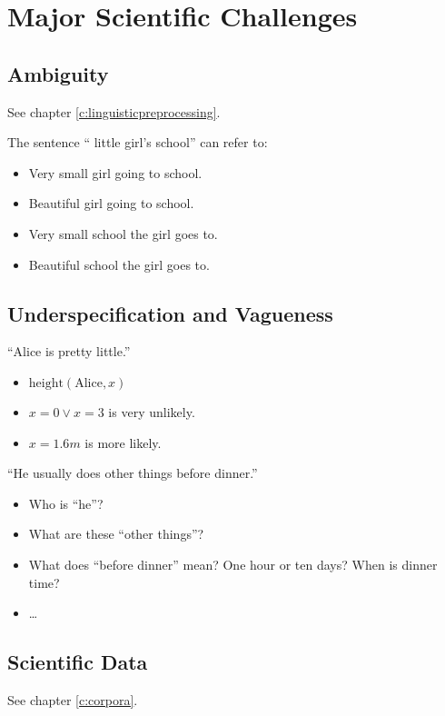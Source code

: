     \section{Major Scientific Challenges} %
        \subsection{Ambiguity} %
        	See chapter \ref{c:linguisticpreprocessing}.
        	
        	The sentence \enquote{ little girl's school} can refer to:
        	\begin{itemize}
        		\item Very small girl going to school.
        		\item Beautiful girl going to school.
        		\item Very small school the girl goes to.
        		\item Beautiful school the girl goes to.
        	\end{itemize}

        \subsection{Underspecification and Vagueness} %
            \enquote{Alice is pretty little.}
            \begin{itemize}
            	\item \( \text{height}(\text{Alice}, x) \)
            	\item \( x = 0 \lor x = 3 \) is very unlikely.
            	\item \( x = 1.6m \) is more likely.
            \end{itemize}
        
        	\enquote{He usually does other things before dinner.}
        	\begin{itemize}
        		\item Who is \enquote{he}?
        		\item What are these \enquote{other things}?
        		\item What does \enquote{before dinner} mean? One hour or ten days? When is dinner time?
        		\item \dots
        	\end{itemize}

        \subsection{Scientific Data} %
        	See chapter \ref{c:corpora}.
        
